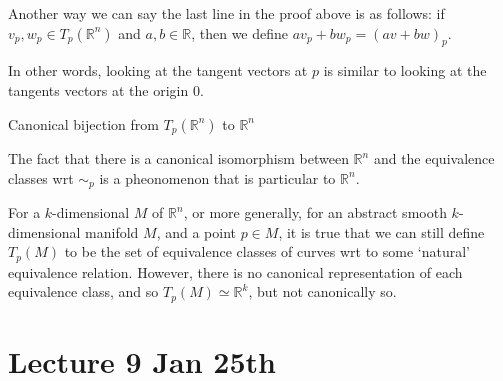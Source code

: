 \documentclass[notoc,notitlepage]{tufte-book}
\begin{document}
\begin{note}
  Another way we can say the last line in the proof above is as follows: if
  $v_p, w_p \in T_p(\mathbb{R}^n)$ and $a, b \in \mathbb{R}$, then we define
  $a v_p + b w_p = (av + bw)_p$.

  In other words, looking at the tangent vectors at $p$ is similar to looking
  at the tangents vectors at the origin $0$.
  \begin{marginfigure}
    \centering
    \caption{Canonical bijection from $T_p(\mathbb{R}^n)$ to $\mathbb{R}^n$}\label{fig:canonical_bijection_from_t_p_r_n_to_r_n_}
  \end{marginfigure}
\end{note}

\begin{note}
  The fact that there is a canonical isomorphism between $\mathbb{R}^n$ and the
  equivalence classes wrt $\sim_p$ is a pheonomenon that is particular to $\mathbb{R}^n$.

  For a $k$-dimensional  $M$ of $\mathbb{R}^n$, or more generally,
  for an abstract smooth $k$-dimensional manifold $M$, and a point $p \in M$, it is
  true that we can still define $T_p(M)$ to be the set of equivalence classes of
  curves wrt to some `natural' equivalence relation. However, there is no canonical
  representation of each equivalence class, and so $T_p(M) \simeq \mathbb{R}^k$, but
  not canonically so.
\end{note}



\chapter{Lecture 9 Jan 25th}%
\label{chp:lecture_9_jan_25th}
\end{document}
